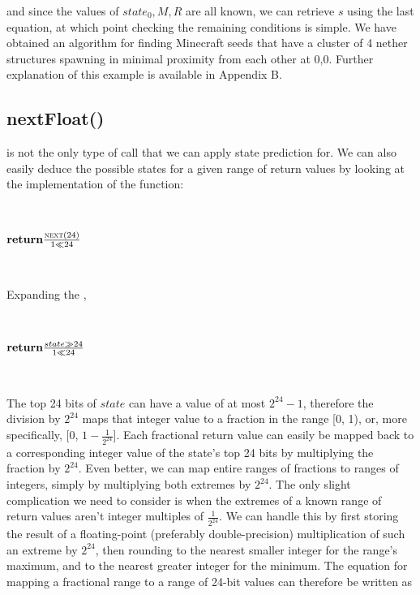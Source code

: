 \documentclass{article}
\begin{document}
and since the values of $state_0, M, R$ are all known, we can retrieve $s$ using the last equation, at which point checking the remaining conditions is simple. We have obtained an algorithm for finding Minecraft seeds that have a cluster of 4 nether structures spawning in minimal proximity from each other at 0,0. Further explanation of this example is available in Appendix B. %

\subsection{ nextFloat() }

 is not the only type of call that we can apply state prediction for. We can also easily deduce the possible states for a given range of  return values by looking at the implementation of the function:

\
\begin{algorithmic}
\State $\Return \frac{\Call{next}{24}}{1 \ll 24}$
\EndFunction
\end{algorithmic}
\ \

\noindent Expanding the \Call{next}{24},

\
\begin{algorithmic}
\Function{nextFloat}{}
\State \Call{nextSeed}{}
\State $\Return \frac{state \gg 24}{1 \ll 24}$
\EndFunction
\end{algorithmic}
\ \

\noindent The top 24 bits of $state$ can have a value of at most $2^{24} - 1$, therefore the division by $2^{24}$ maps that integer value to a fraction in the range [0, 1), or, more specifically,
[0, $1 - \frac{1}{2^{24}}$]. Each fractional  return value can easily be mapped back to a corresponding integer value of the state's top 24 bits by multiplying the fraction by $2^{24}$. 
Even better, we can map entire ranges of fractions to ranges of integers, simply by multiplying both extremes by $2^{24}$. The only slight complication we need to consider is when the extremes of a known range of  return values aren't integer multiples of $\frac{1}{2^{24}}$. We can handle this by first storing the result of a floating-point (preferably double-precision) multiplication of such an extreme by $2^{24}$, then rounding to the nearest smaller integer for the range's maximum, and to the nearest greater integer for the minimum. 
The equation for mapping a fractional range to a range of 24-bit values can therefore be written as
\end{document}
